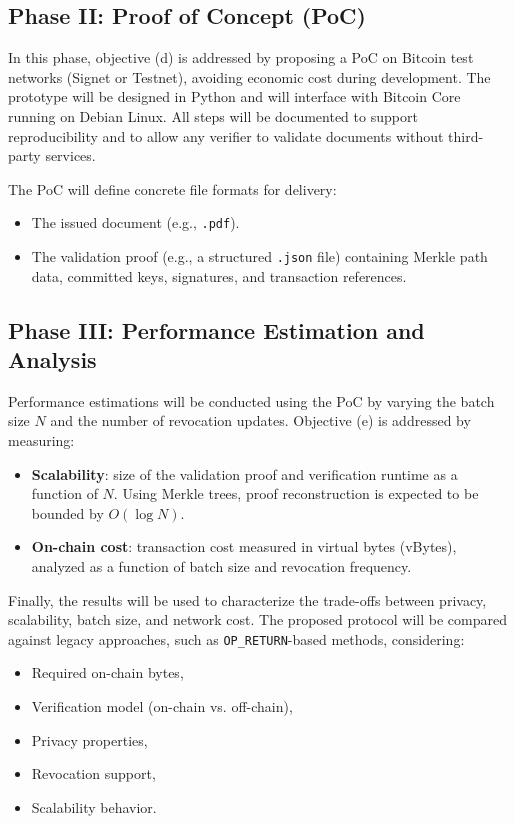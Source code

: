 \subsection{Phase II: Proof of Concept (PoC)}

In this phase, objective (d) is addressed by proposing a PoC on Bitcoin test networks (Signet or Testnet), avoiding economic cost during development.
The prototype will be designed in Python and will interface with Bitcoin Core running on Debian Linux.
All steps will be documented to support reproducibility and to allow any verifier to validate documents without third-party services.

The PoC will define concrete file formats for delivery:
\begin{itemize}
    \item The issued document (e.g., \texttt{.pdf}).
    \item The validation proof (e.g., a structured \texttt{.json} file) containing Merkle path data, committed keys, signatures, and transaction references.
\end{itemize}

\subsection{Phase III: Performance Estimation and Analysis}

Performance estimations will be conducted using the PoC by varying the batch size $N$ and the number of revocation updates.
Objective (e) is addressed by measuring:

\begin{itemize}
    \item \textbf{Scalability}: size of the validation proof and verification runtime as a function of $N$.
    Using Merkle trees, proof reconstruction is expected to be bounded by $O(\log N)$.
    \item \textbf{On-chain cost}: transaction cost measured in virtual bytes (vBytes), analyzed as a function of batch size and revocation frequency.
\end{itemize}

Finally, the results will be used to characterize the trade-offs between privacy, scalability, batch size, and network cost.
The proposed protocol will be compared against legacy approaches, such as \texttt{OP\_RETURN}-based methods, considering:

\begin{itemize}
    \item Required on-chain bytes,
    \item Verification model (on-chain vs. off-chain),
    \item Privacy properties,
    \item Revocation support,
    \item Scalability behavior.
\end{itemize}
